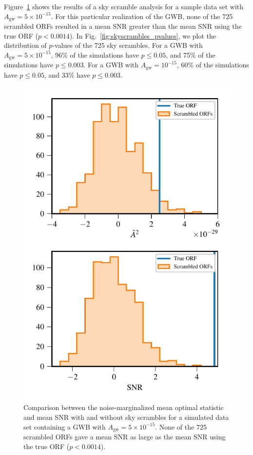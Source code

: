 \documentclass[twocolumn,aps,prd,superscriptaddress]{revtex4-1}
\newcommand{\Agw}{\ensuremath{A_\mathrm{gw}}}
\begin{document}
Figure~\ref{fig:skyscrambles_dataset_sample} shows the results of a sky scramble analysis 
for a sample data set with $\Agw=5\times10^{-15}$. 
For this particular realization of the GWB, 
none of the 725 scrambled ORFs resulted in a mean SNR greater than 
the mean SNR using the true ORF ($p < 0.0014$).
In Fig.~\ref{fig:skyscrambles_pvalues}, we plot the distribution of $p$-values of the 725 sky scrambles. 
For a GWB with $\Agw = 5\times10^{-15}$, 96\% of the simulations have $p \leq 0.05$, 
and 75\% of the simulations have $p \leq 0.003$. 
For a GWB with $\Agw = 10^{-15}$, 60\% of the simulations have $p \leq 0.05$, 
and 33\% have $p \leq 0.003$.
\begin{figure}[tb]
	\includegraphics[width=0.9\columnwidth]{plots/optstat_scrambled_dataset11.pdf}
	\caption{Comparison between the noise-marginalized mean optimal statistic and mean SNR 
			with and without sky scrambles for a simulated data set 
			containing a GWB with $\Agw = 5\times10^{-15}$. 
			None of the 725 scrambled ORFs gave a mean SNR as large 
			as the mean SNR using the true ORF ($p < 0.0014$).}
	\label{fig:skyscrambles_dataset_sample}
\end{figure}
\end{document}
